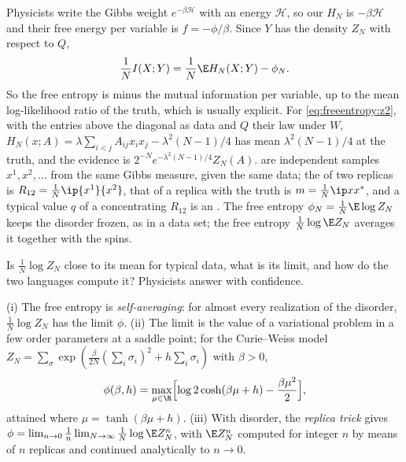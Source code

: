 \begin{refsection}
Physicists write the Gibbs weight $e^{-\beta\mathcal H}$ with an energy $\mathcal H$, so our $H_N$ is $-\beta\mathcal H$ and their free energy per variable is $f=-\phi/\beta$. Since $Y$ has the density $Z_N$ with respect to $Q$,
\begin{equation}\label{eq:freeentropy:mi}
\frac1NI(X;Y)=\frac1N\E H_N(X;Y)-\phi_N .
\end{equation}
So the free entropy is minus the mutual information per variable, up to the mean log-likelihood ratio of the truth, which is usually explicit. For \eqref{eq:freeentropy:z2}, with the entries above the diagonal as data and $Q$ their law under $W$, $H_N(x;A)=\lambda\sum_{i<j}A_{ij}x_ix_j-\lambda^2(N-1)/4$ has mean $\lambda^2(N-1)/4$ at the truth, and the evidence is $2^{-N}e^{-\lambda^2(N-1)/4}Z_N(A)$.  are independent samples $x^1,x^2,\dots$ from the same Gibbs measure, given the same data; the  of two replicas is $R_{12}=\frac1N\ip{x^1}{x^2}$, that of a replica with the truth is $m=\frac1N\ip x{x^*}$, and a typical value $q$ of a concentrating $R_{12}$ is an . The  free entropy $\phi_N=\frac1N\E\log Z_N$ keeps the disorder frozen, as in a data set; the  free entropy $\frac1N\log\E Z_N$ averages it together with the spins.

Is $\frac1N\log Z_N$ close to its mean for typical data, what is its limit, and how do the two languages compute it? Physicists answer with confidence.

\begin{physicsbox}
(i) The free entropy is \emph{self-averaging}: for almost every realization of the disorder, $\frac1N\log Z_N$ has the limit $\phi$. (ii) The limit is the value of a variational problem in a few order parameters at a saddle point; for the Curie--Weiss model $Z_N=\sum_\sigma\exp(\frac\beta{2N}(\sum_i\sigma_i)^2+h\sum_i\sigma_i)$ with $\beta>0$,
\[
\phi(\beta,h)=\max_{\mu\in\R}\Bigl[\log2\cosh(\beta\mu+h)-\frac{\beta\mu^2}2\Bigr],
\]
attained where $\mu=\tanh(\beta\mu+h)$. (iii) With disorder, the \emph{replica trick} gives $\phi=\lim_{n\to0}\frac1n\lim_{N\to\infty}\frac1N\log\E Z_N^n$, with $\E Z_N^n$ computed for integer $n$ by means of $n$ replicas and continued analytically to $n\to0$.
\end{physicsbox}


\end{refsection}
